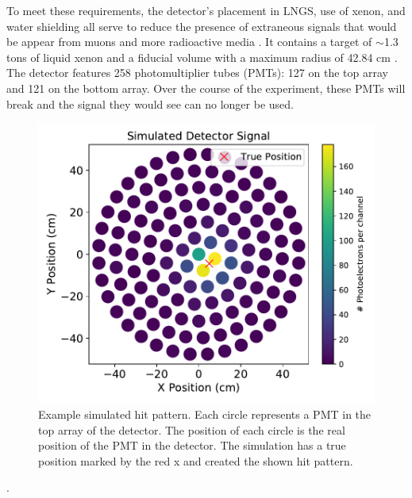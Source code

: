 \documentclass[thesis.tex]{subfiles}
\begin{document}
To meet these requirements, the detector's placement in LNGS, use of xenon, and water shielding all serve to reduce the presence of extraneous signals that would be appear from muons and more radioactive media \cite{Xenon1t}.
It contains a target of $\sim$1.3 tons of liquid xenon and a fiducial volume with a maximum radius of 42.84 cm \cite{1TDM_DataAnalysis}.
The detector features 258 photomultiplier tubes (PMTs): 127 on the top array and 121 on the bottom array.
Over the course of the experiment, these PMTs will break and the signal they would see can no longer be used.
\begin{figure}
	\centering
	\includegraphics[width=\linewidth]{figures/opt_sim_hit_989.pdf}
	\caption{Example simulated hit pattern.
	Each circle represents a PMT in the top array of the detector.
	The position of each circle is the real position of the PMT in the detector.
	The simulation has a true position marked by the red x and created the shown hit pattern.}
	\label{fig:example_hit}
\end{figure}
 \cite{Xenon1t}.
\end{document}
